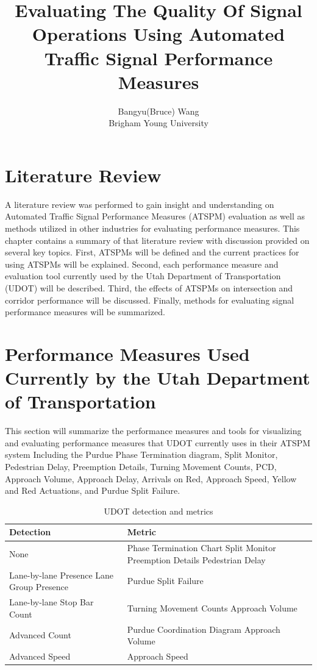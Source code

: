 \documentclass [12pt]{article}
\title{Evaluating The Quality Of Signal Operations Using Automated Traffic Signal Performance Measures}
\author{Bangyu(Bruce) Wang\\Brigham Young University}
\begin{document}
\maketitle
\nocite{*}

\section{Literature Review}
A literature review was performed to gain insight and understanding on Automated Traffic Signal Performance Measures (ATSPM) evaluation as well as methods utilized in other industries for evaluating performance measures\cite{day2014performance}. This chapter contains a summary of that literature review with discussion provided on several key topics.  First, ATSPMs will be defined and the current practices for using ATSPMs will be explained. Second, each performance measure and evaluation tool currently used by the Utah Department of Transportation (UDOT) will be described. Third, the effects of ATSPMs on intersection and corridor performance will be discussed. Finally, methods for evaluating signal performance measures will be summarized\cite{day2018data}.

\section{Performance Measures Used Currently by the Utah Department of Transportation}
This section will summarize the performance measures and tools for visualizing and evaluating performance measures that UDOT currently uses in their ATSPM system Including the Purdue Phase Termination diagram, Split Monitor, Pedestrian Delay, Preemption Details, Turning Movement Counts, PCD, Approach Volume, Approach Delay, Arrivals on Red, Approach Speed, Yellow and Red Actuations, and Purdue Split Failure.

\begin{table}[ht]
    \centering
    \begin{tabular}{|p{6cm}|p{6cm}|}
    \hline
    Detection & Metric \\
    \hline
    None & Phase Termination Chart \newline Split Monitor \newline Preemption Details \newline Pedestrian Delay \\
    \hline
    Lane-by-lane Presence \newline Lane Group Presence & Purdue Split Failure \\
    \hline
    Lane-by-lane \newline Stop Bar Count & Turning Movement Counts \newline Approach Volume \\
    \hline
    Advanced Count & Purdue Coordination Diagram \newline Approach Volume \\
    \hline
    Advanced Speed & Approach Speed \\
    \hline
    \end{tabular}
    \caption{UDOT detection and metrics}
    \label{tab:my_label}
\end{table}
\end{document}
